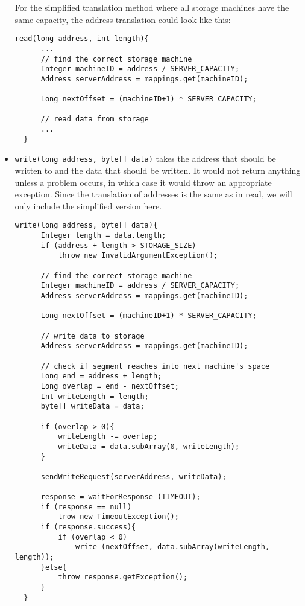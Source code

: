\documentclass[12pt,a4paper]{article}
\begin{document}
\begin{itemize}
  For the simplified translation method where all storage machines have the same capacity, the address translation could look like this:
  \begin{lstlisting}[basicstyle=\footnotesize]
  read(long address, int length){ 
      ...
      // find the correct storage machine     
      Integer machineID = address / SERVER_CAPACITY;
      Address serverAddress = mappings.get(machineID);
      
      Long nextOffset = (machineID+1) * SERVER_CAPACITY;
      
      // read data from storage
      ...
  }
  \end{lstlisting}
  
  \item \texttt{write(long address, byte[] data)} takes the address that should be written to and the data that should be written. It would not return anything unless a problem occurs, in which case it would throw an appropriate exception. Since the translation of addresses is the same as in read, we will only include the simplified version here.
  
  \begin{lstlisting}[basicstyle=\footnotesize]
  write(long address, byte[] data){
      Integer length = data.length;
      if (address + length > STORAGE_SIZE)
          throw new InvalidArgumentException();
          
      // find the correct storage machine     
      Integer machineID = address / SERVER_CAPACITY;
      Address serverAddress = mappings.get(machineID);
      
      Long nextOffset = (machineID+1) * SERVER_CAPACITY;
      
      // write data to storage
      Address serverAddress = mappings.get(machineID);
      
      // check if segment reaches into next machine's space
      Long end = address + length;
      Long overlap = end - nextOffset;
      Int writeLength = length;
      byte[] writeData = data;
      
      if (overlap > 0){
          writeLength -= overlap;
          writeData = data.subArray(0, writeLength);
      }
      
      sendWriteRequest(serverAddress, writeData);
      
      response = waitForResponse (TIMEOUT);
      if (response == null)
          trow new TimeoutException();
      if (response.success){
          if (overlap < 0)
              write (nextOffset, data.subArray(writeLength, length));
      }else{
          throw response.getException();
      }
  }
  \end{lstlisting}
\end{itemize}
\end{document}
